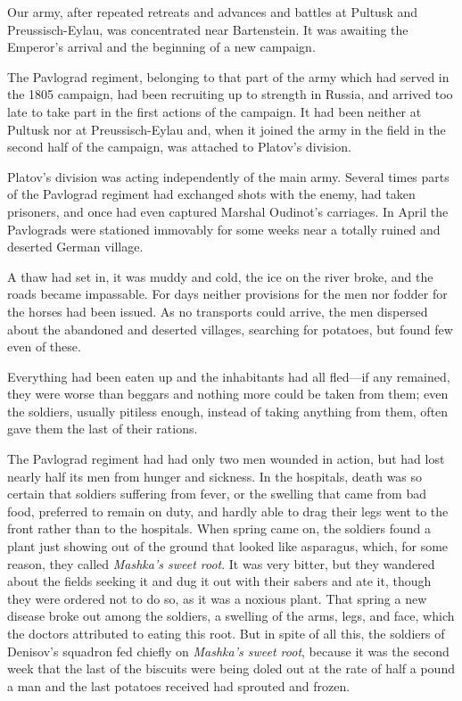 Our army, after repeated retreats and advances and battles at
Pultusk and Preussisch-Eylau, was concentrated near
Bartenstein. It was awaiting the Emperor's arrival and the
beginning of a new campaign.

The Pavlograd regiment, belonging to that part of the army which
had served in the 1805 campaign, had been recruiting up to
strength in Russia, and arrived too late to take part in the
first actions of the campaign. It had been neither at Pultusk nor
at Preussisch-Eylau and, when it joined the army in the field in
the second half of the campaign, was attached to Platov's
division.

Platov's division was acting independently of the main
army. Several times parts of the Pavlograd regiment had exchanged
shots with the enemy, had taken prisoners, and once had even
captured Marshal Oudinot's carriages. In April the Pavlograds
were stationed immovably for some weeks near a totally ruined and
deserted German village.

A thaw had set in, it was muddy and cold, the ice on the river
broke, and the roads became impassable. For days neither
provisions for the men nor fodder for the horses had been
issued. As no transports could arrive, the men dispersed about
the abandoned and deserted villages, searching for potatoes, but
found few even of these.

Everything had been eaten up and the inhabitants had all
fled---if any remained, they were worse than beggars and nothing
more could be taken from them; even the soldiers, usually
pitiless enough, instead of taking anything from them, often gave
them the last of their rations.

The Pavlograd regiment had had only two men wounded in action,
but had lost nearly half its men from hunger and sickness. In the
hospitals, death was so certain that soldiers suffering from
fever, or the swelling that came from bad food, preferred to
remain on duty, and hardly able to drag their legs went to the
front rather than to the hospitals. When spring came on, the
soldiers found a plant just showing out of the ground that looked
like asparagus, which, for some reason, they called
\emph{Mashka's sweet root}. It was very bitter, but they wandered
about the fields seeking it and dug it out with their sabers and
ate it, though they were ordered not to do so, as it was a
noxious plant. That spring a new disease broke out among the
soldiers, a swelling of the arms, legs, and face, which the
doctors attributed to eating this root. But in spite of all this,
the soldiers of Denisov's squadron fed chiefly on \emph{Mashka's
  sweet root}, because it was the second week that the last of
the biscuits were being doled out at the rate of half a pound a
man and the last potatoes received had sprouted and frozen.

